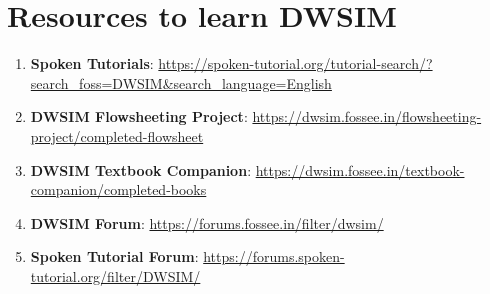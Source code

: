 \documentclass[12pt,a4paper]{article}
\begin{document}
\section{Resources to learn DWSIM}

\begin{enumerate}

\item \textbf{Spoken Tutorials}: \url{https://spoken-tutorial.org/tutorial-search/?search_foss=DWSIM&search_language=English}

\item \textbf{DWSIM Flowsheeting Project}: \url{https://dwsim.fossee.in/flowsheeting-project/completed-flowsheet}

\item \textbf{DWSIM Textbook Companion}: \url{https://dwsim.fossee.in/textbook-companion/completed-books}

\item \textbf{DWSIM Forum}: \url{https://forums.fossee.in/filter/dwsim/}

\item \textbf{Spoken Tutorial Forum}: \url{https://forums.spoken-tutorial.org/filter/DWSIM/}

\end{enumerate}
\end{document}
